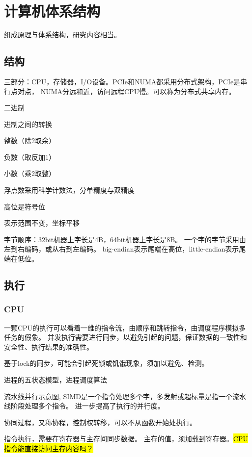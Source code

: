 \chapter{计算机体系结构}

组成原理与体系结构，研究内容相当。

\section{结构}

三部分：CPU，存储器，I/O设备。PCIe和NUMA都采用分布式架构，PCIe是串行点对点，
NUMA分远和近，访问远程CPU慢。可以称为分布式共享内存。

二进制

进制之间的转换
\begin{enumbox}
\item 整数（除2取余）
\item 负数（取反加1）
\item 小数（乘2取整）
\item 浮点数采用科学计数法，分单精度与双精度
\item 高位是符号位
\item 表示范围不变，坐标平移
\end{enumbox}

字节顺序：32bit机器上字长是4B，64bit机器上字长是8B。
一个字的字节采用由左到右编码，或从右到左编码。
big-endian表示尾端在高位，little-endian表示尾端在低位。

\section{执行}

\subsection{CPU}

一颗CPU的执行可以看着一维的指令流，由顺序和跳转指令，由调度程序模拟多任务的假象。
并发执行需要进行同步，以避免引起的问题，保证数据的一致性和安全性、执行结果的准确性。

基于lock的同步，可能会引起死锁或饥饿现象，须加以避免、检测。

进程的五状态模型，进程调度算法

流水线并行示意图, SIMD是一个指令处理多个字，多发射或超标量是指一个流水线阶段处理多个指令。
进一步提高了执行的并行度。

协同过程，又称协程，控制权转移，可以不从函数开始处执行。

指令执行，需要在寄存器与主存间同步数据。
主存的值，须加载到寄存器。\hl{CPU指令能直接访问主存内容吗？}

